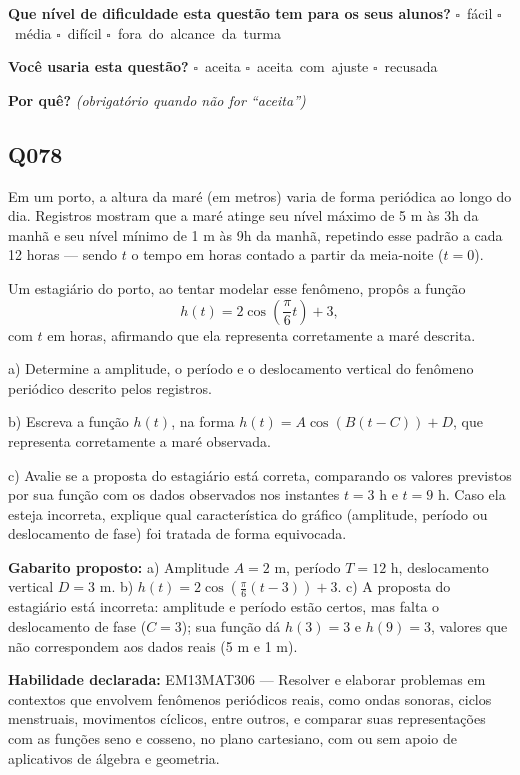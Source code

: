 \documentclass[11pt,a4paper]{article}
\begin{document}
\textbf{Que nível de dificuldade esta questão tem para os seus alunos?}\quad
\mbox{$\square$~fácil} \quad \mbox{$\square$~média} \quad
\mbox{$\square$~difícil} \quad \mbox{$\square$~fora do alcance da turma}

\textbf{Você usaria esta questão?}\quad
\mbox{$\square$~aceita} \quad \mbox{$\square$~aceita com ajuste} \quad
\mbox{$\square$~recusada}

\textbf{Por quê?} \emph{(obrigatório quando não for ``aceita'')}

\underline{\hspace{\linewidth}}

\underline{\hspace{\linewidth}}
\vspace{0.6em}

\begin{samepage}
\subsection*{Q078}
Em um porto, a altura da maré (em metros) varia de forma periódica ao longo do dia. Registros mostram que a maré atinge seu nível máximo de 5 m às 3h da manhã e seu nível mínimo de 1 m às 9h da manhã, repetindo esse padrão a cada 12 horas — sendo $t$ o tempo em horas contado a partir da meia-noite ($t=0$).

Um estagiário do porto, ao tentar modelar esse fenômeno, propôs a função
$$h(t) = 2\cos\left(\frac{\pi}{6}t\right) + 3,$$
com $t$ em horas, afirmando que ela representa corretamente a maré descrita.

a) Determine a amplitude, o período e o deslocamento vertical do fenômeno periódico descrito pelos registros.

b) Escreva a função $h(t)$, na forma $h(t) = A\cos(B(t-C)) + D$, que representa corretamente a maré observada.

c) Avalie se a proposta do estagiário está correta, comparando os valores previstos por sua função com os dados observados nos instantes $t=3$ h e $t=9$ h. Caso ela esteja incorreta, explique qual característica do gráfico (amplitude, período ou deslocamento de fase) foi tratada de forma equivocada.

\textbf{Gabarito proposto:} a) Amplitude $A=2$ m, período $T=12$ h, deslocamento vertical $D=3$ m. b) $h(t) = 2\cos\left(\frac{\pi}{6}(t-3)\right)+3$. c) A proposta do estagiário está incorreta: amplitude e período estão certos, mas falta o deslocamento de fase ($C=3$); sua função dá $h(3)=3$ e $h(9)=3$, valores que não correspondem aos dados reais (5 m e 1 m).

\textbf{Habilidade declarada:} EM13MAT306 --- Resolver e elaborar problemas em contextos que envolvem fenômenos periódicos reais, como ondas sonoras, ciclos menstruais, movimentos cíclicos, entre outros, e comparar suas representações com as funções seno e cosseno, no plano cartesiano, com ou sem apoio de aplicativos de álgebra e geometria.
\end{samepage}
\end{document}
